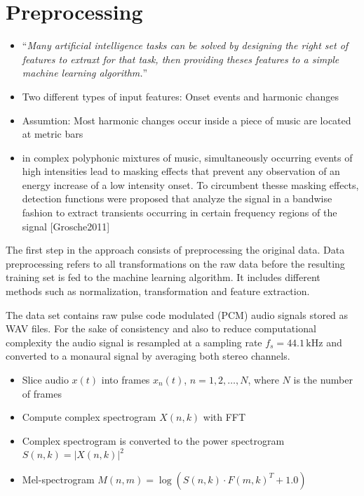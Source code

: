 \documentclass{article}
\begin{document}
\section{Preprocessing}

\begin{itemize}
\item ``\emph{Many artificial intelligence tasks can be solved by designing the right set of features to extraxt for that task, then providing theses features to a simple machine learning algorithm.}'' \cite[Goodfellow2016]{Goodfellow2016}
\item Two different types of input features: Onset events and harmonic changes
\item Assumtion: Most harmonic changes occur inside a piece of music are located at metric bars \cite[Khadkevich2012]{Khadkevich2012}
\item in complex polyphonic mixtures of music, simultaneously occurring events of high intensities lead to masking effects that prevent any observation of an energy increase of a low intensity onset. To circumbent thesse masking effects, detection functions were proposed that analyze the signal in a bandwise fashion to extract transients occurring in certain frequency regions of the signal [Grosche2011]
\end{itemize}



The first step in the approach consists of preprocessing the original data. Data preprocessing refers to all transformations on the raw data before the resulting training set is fed to the machine learning algorithm. It includes different methods such as normalization, transformation and feature extraction. 

The data set contains raw pulse code modulated (PCM) audio signals stored as WAV files. For the sake of consistency and also to reduce computational complexity the audio signal is resampled at a sampling rate $f_s = 44.1 \,\text{kHz}$ and converted to a monaural signal by averaging both stereo channels. 


\begin{itemize}
\item Slice audio $x(t)$ into frames $x_n(t)$, $n = 1, 2,\dots, N$, where $N$ is the number of frames
\item Compute complex spectrogram $X(n,k)$ with FFT 
\item Complex spectrogram is converted to the power spectrogram $S(n, k) = |X(n, k)|^2$
\item Mel-spectrogram $M(n,m) = \log \left( S(n,k) \cdot F(m,k)^T + 1.0 \right)$
\end{itemize}
\vspace{1em}
\end{document}
